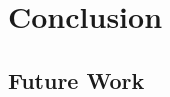 \documentclass[conference]{IEEEtran}
\begin{document}
\section{Conclusion}



\subsection{Future Work}


\newpage
\printbibliography
\end{document}
